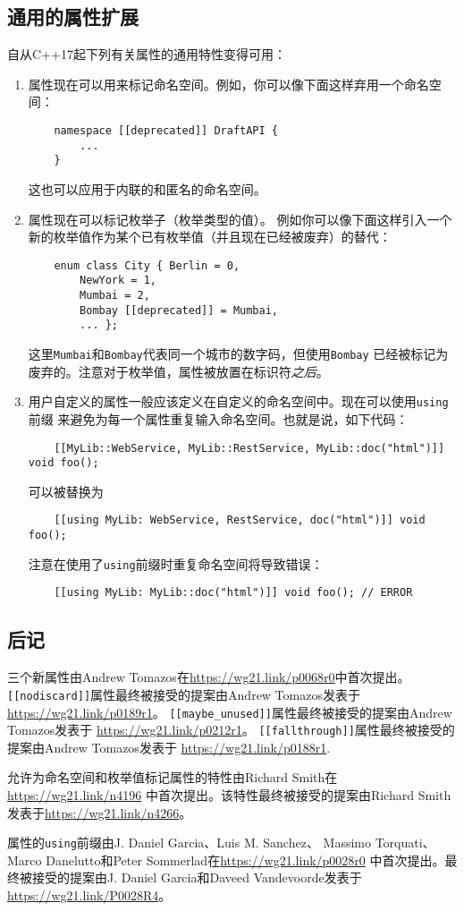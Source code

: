 \subsection{通用的属性扩展}
自从C++17起下列有关属性的通用特性变得可用：
\begin{enumerate}[leftmargin=*]
    \item 属性现在可以用来标记命名空间。例如，你可以像下面这样弃用一个命名空间：
    \begin{lstlisting}
    namespace [[deprecated]] DraftAPI {
        ...
    }
    \end{lstlisting}
    这也可以应用于内联的和匿名的命名空间。
    \item 属性现在可以标记枚举子（枚举类型的值）。
    例如你可以像下面这样引入一个新的枚举值作为某个已有枚举值（并且现在已经被废弃）的替代：
    \begin{lstlisting}
    enum class City { Berlin = 0,
        NewYork = 1,
        Mumbai = 2,
        Bombay [[deprecated]] = Mumbai,
        ... };
    \end{lstlisting}
    这里\texttt{Mumbai}和\texttt{Bombay}代表同一个城市的数字码，但使用\texttt{Bombay}
    已经被标记为废弃的。注意对于枚举值，属性被放置在标识符\emph{之后}。
    \item 用户自定义的属性一般应该定义在自定义的命名空间中。现在可以使用\texttt{using}前缀
    来避免为每一个属性重复输入命名空间。也就是说，如下代码：
    \begin{lstlisting}
    [[MyLib::WebService, MyLib::RestService, MyLib::doc("html")]] void foo();
    \end{lstlisting}
    可以被替换为
    \begin{lstlisting}
    [[using MyLib: WebService, RestService, doc("html")]] void foo();
    \end{lstlisting}
    注意在使用了\texttt{using}前缀时重复命名空间将导致错误：
    \begin{lstlisting}
    [[using MyLib: MyLib::doc("html")]] void foo(); // ERROR
    \end{lstlisting}
\end{enumerate}

\subsection{后记}
三个新属性由Andrew Tomazos在\url{https://wg21.link/p0068r0}中首次提出。
\texttt{[[nodiscard]]}属性最终被接受的提案由Andrew Tomazos发表于
\url{https://wg21.link/p0189r1}。
\texttt{[[maybe\_unused]]}属性最终被接受的提案由Andrew Tomazos发表于
\url{https://wg21.link/p0212r1}。
\texttt{[[fallthrough]]}属性最终被接受的提案由Andrew Tomazos发表于
\url{https://wg21.link/p0188r1}.

允许为命名空间和枚举值标记属性的特性由Richard Smith在\url{https://wg21.link/n4196}
中首次提出。该特性最终被接受的提案由Richard Smith发表于\url{https://wg21.link/n4266}。

属性的\texttt{using}前缀由J. Daniel Garcia、Luis M. Sanchez、
Massimo Torquati、Marco Danelutto和Peter Sommerlad在\url{https://wg21.link/p0028r0}
中首次提出。最终被接受的提案由J. Daniel Garcia和Daveed Vandevoorde发表于
\url{https://wg21.link/P0028R4}。